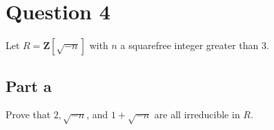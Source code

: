\section{Question 4}

\begin{question}
    Let $R=\mathbf{Z}[\sqrt{-n}]$ with $n$ a squarefree integer greater than 3.
\end{question}

\subsection{Part a}

\begin{question}
    Prove that $2, \sqrt{-n}$, and $1+\sqrt{-n}$ are all irreducible in $R$.
\end{question}

